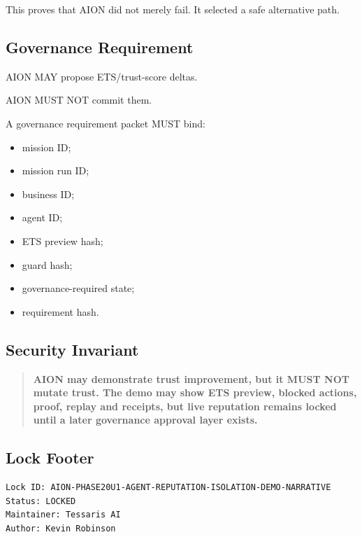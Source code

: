 This proves that AION did not merely fail. It selected a safe alternative path.

\subsection{Governance Requirement}

AION MAY propose ETS/trust-score deltas.

AION MUST NOT commit them.

A governance requirement packet MUST bind:

\begin{itemize}
  \item mission ID;
  \item mission run ID;
  \item business ID;
  \item agent ID;
  \item ETS preview hash;
  \item guard hash;
  \item governance-required state;
  \item requirement hash.
\end{itemize}

\subsection{Security Invariant}

\begin{quote}
\textbf{AION may demonstrate trust improvement, but it MUST NOT mutate trust. The demo may show ETS preview, blocked actions, proof, replay and receipts, but live reputation remains locked until a later governance approval layer exists.}
\end{quote}

\subsection{Lock Footer}

\begin{verbatim}
Lock ID: AION-PHASE20U1-AGENT-REPUTATION-ISOLATION-DEMO-NARRATIVE
Status: LOCKED
Maintainer: Tessaris AI
Author: Kevin Robinson
\end{verbatim}
